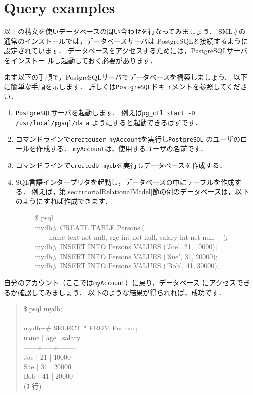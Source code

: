 \documentclass{jbook}
\newif\ifjp
\newcommand{\txt}[2]{#2}
\newcommand{\smlsharp}{SML\#}
\newcommand{\myem}{\mbox{\ \ }}
\newenvironment{program}{\begin{quote}\begin{tt}}%
                        {\end{tt}\end{quote}}
\begin{document}
\section{\txt{データベース問い合わせ実行例}{Query examples}}
\label{sec:tutorialSQLExample}

\ifjp%
	以上の構文を使いデータベースの問い合わせを行なってみましょう．
	\smlsharp{}の通常のインストールでは，データベースサーバは
PostgreSQLと接続するように設定されています．
	データベースをアクセスするためには，PostgreSQLサーバをインストー
ルし起動しておく必要があります． 
	
	まず以下の手順で，PostgreSQLサーバでデータベースを構築しましょう．
	以下に簡単な手順を示します．
	詳しくは{\tt PostgreSQL}ドキュメントを参照してください．
\begin{enumerate}
\item {\tt PostgreSQL}サーバを起動します．
	例えば{\tt pg\_ctl start -D /usr/local/pgsql/data}
ようにすると起動できるはずです．
\item コマンドラインで{\tt createuser myAccount}を実行し{\tt PostgreSQL}
のユーザのロールを作成する．
	{\tt myAccount}は，使用するユーザの名前です．
\item 
コマンドラインで{\tt createdb mydb}を実行しデータベースを作成する．
\begin{quote}

\end{quote}
\item SQL言語インタープリタを起動し，データベースの中にテーブルを作成す
る．
	例えば，第\ref{sec:tutorialRelationalModel}節の例のデータベースは，以下
のようにすれば作成できます．
\begin{program}
\$ psql\\
mydb\# CREATE TABLE Persons (\\
\myem\myem name text not null, age int not null, salary int not null
\myem );\\
mydb\# INSERT INTO Persons VALUES ('Joe', 21, 10000);\\
mydb\# INSERT INTO Persons VALUES ('Sue', 31, 20000);\\
mydb\# INSERT INTO Persons VALUES ('Bob', 41, 30000);\\
\end{program}
\end{enumerate}
	自分のアカウント（ここでは{\tt myAccount}）に戻り，データベース
にアクセスできるか確認してみましょう．
	以下のような結果が得られれば，成功です．
\begin{program}
\$ psql mydb;\\
\\
mydb=\# SELECT * FROM Persons;\\
 name | age | salary \\
------+-----+--------\\
 Joe  |  21 |  10000\\
 Sue  |  31 |  20000\\
 Bob  |  41 |  20000\\
(3 行)
\end{program}
\end{document}
